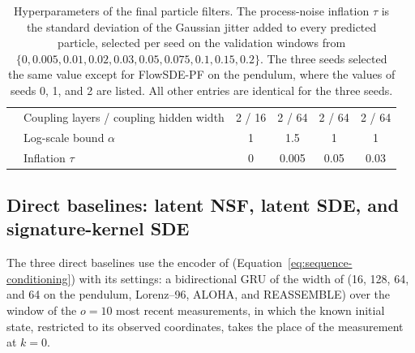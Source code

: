 \begin{table}[htbp]
{\begin{tabular}{llcccc}
 & Coupling layers / coupling hidden width & 2 / 16 & 2 / 64 & 2 / 64 & 2 / 64 \\
 & Log-scale bound $\alpha$ & 1 & 1.5 & 1 & 1 \\
 & Inflation $\tau$ & 0 & 0.005 & 0.05 & 0.03 \\
\bottomrule
\end{tabular}
}
\caption{Hyperparameters of the final particle filters. The process-noise inflation $\tau$ is the standard deviation of the Gaussian jitter added to every predicted particle, selected per seed on the validation windows from $\{0, 0.005, 0.01, 0.02, 0.03, 0.05, 0.075, 0.1, 0.15, 0.2\}$. The three seeds selected the same value except for FlowSDE-PF on the pendulum, where the values of seeds 0, 1, and 2 are listed. All other entries are identical for the three seeds.}
\label{tab:pf-hparams}
\end{table}

\subsection{Direct baselines: latent NSF, latent SDE, and signature-kernel SDE}\label{app:direct-baselines}
The three direct baselines use the encoder of \method (Equation~\eqref{eq:sequence-conditioning}) with its settings: a bidirectional GRU of the width of \method (16, 128, 64, and 64 on the pendulum, Lorenz--96, ALOHA, and REASSEMBLE) over the window of the $o=10$ most recent measurements, in which the known initial state, restricted to its observed coordinates, takes the place of the measurement at $k=0$.

